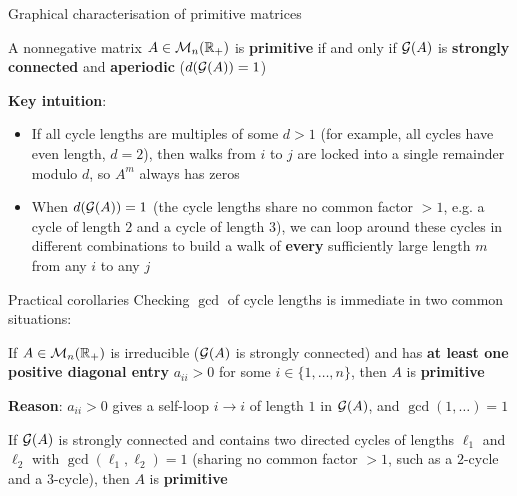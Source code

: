\documentclass[aspectratio=169]{beamer}\usepackage[]{graphicx}\usepackage[]{xcolor}
\begin{document}
\begin{frame}{Graphical characterisation of primitive matrices}
\begin{theorem}
\label{th:primitive-iff-sc-aperiodic}
A nonnegative matrix $A \in \mathcal{M}_n(\mathbb{R}_+)$ is \textbf{primitive} if and only if $\mathcal{G}(A)$ is \textbf{strongly connected} and \textbf{aperiodic} ($d(\mathcal{G}(A)) = 1$)
\end{theorem}
\vfill
\textbf{Key intuition}:
\begin{itemize}
\item If all cycle lengths are multiples of some $d > 1$ (for example, all cycles have even length, $d = 2$), then walks from $i$ to $j$ are locked into a single remainder modulo $d$, so $A^m$ always has zeros
\item When $d(\mathcal{G}(A)) = 1$ (the cycle lengths share no common factor $> 1$, e.g. a cycle of length $2$ and a cycle of length $3$), we can loop around these cycles in different combinations to build a walk of \textbf{every} sufficiently large length $m$ from any $i$ to any $j$
\end{itemize}
\end{frame}

\begin{frame}{Practical corollaries}
Checking $\gcd$ of cycle lengths is immediate in two common situations:
\vfill
\begin{importantcorollary}
\label{cor:self-loop-primitive}
If $A \in \mathcal{M}_n(\mathbb{R}_+)$ is irreducible ($\mathcal{G}(A)$ is strongly connected) and has \textbf{at least one positive diagonal entry} $a_{ii} > 0$ for some $i \in \{1, \ldots, n\}$, then $A$ is \textbf{primitive}
\end{importantcorollary}
\textbf{Reason}: $a_{ii} > 0$ gives a self-loop $i \to i$ of length $1$ in $\mathcal{G}(A)$, and $\gcd(1, \ldots) = 1$
\vfill
\begin{corollary}
If $\mathcal{G}(A)$ is strongly connected and contains two directed cycles of lengths $\ell_1$ and $\ell_2$ with $\gcd(\ell_1, \ell_2) = 1$ (sharing no common factor $> 1$, such as a $2$-cycle and a $3$-cycle), then $A$ is \textbf{primitive}
\end{corollary}
\end{frame}
\end{document}

